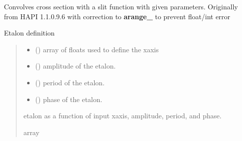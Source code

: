 \documentclass[letterpaper,10pt,english]{sphinxmanual}
\begin{document}
\begin{fulllineitems}
\label{\detokenize{MATS:MATS.utilities.convolveSpectrumSame}}
\pysigstartsignatures
{}
\pysigstopsignatures
\sphinxAtStartPar
Convolves cross section with a slit function with given parameters.
Originally from HAPI 1.1.0.9.6 with correction to {\color{red}\bfseries{}arange\_} to prevent float/int error

\end{fulllineitems}


\begin{fulllineitems}
\label{\detokenize{MATS:MATS.utilities.etalon}}
\pysigstartsignatures
{}
\pysigstopsignatures
\sphinxAtStartPar
Etalon definition
\begin{quote}\begin{description}
\begin{itemize}
\item {} 
\sphinxAtStartPar
{} () \textendash{} array of floats used to define the x\sphinxhyphen{}axis

\item {} 
\sphinxAtStartPar
{} () \textendash{} amplitude of the etalon.

\item {} 
\sphinxAtStartPar
{} () \textendash{} period of the etalon.

\item {} 
\sphinxAtStartPar
{} () \textendash{} phase of the etalon.

\end{itemize}

\sphinxAtStartPar
{} \textendash{} etalon as a function of input x\sphinxhyphen{}axis, amplitude, period, and phase.

\sphinxAtStartPar
array

\end{description}\end{quote}

\end{fulllineitems}
\end{document}
